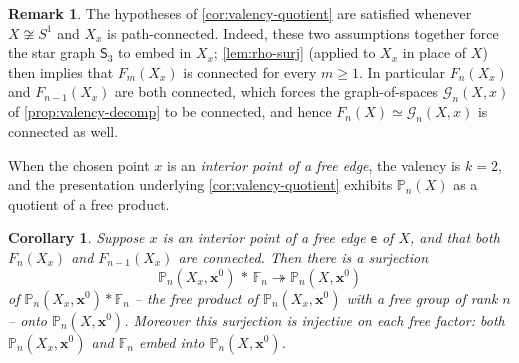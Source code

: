 \documentclass[reqno]{amsart}
\newtheorem{corollary}[theorem]{Corollary}
\theoremstyle{definition}
\newtheorem{remark}[theorem]{Remark}
\newcommand\bfx{\mathbf{x}}
\newcommand\cG{\mathcal{G}}
\newcommand\sfS{\mathsf{S}}
\newcommand\sfe{\mathsf{e}}
\newcommand{\PB}{\mathbb{P}}
\newcommand{\base}{\bfx^0}
\numberwithin{equation}{section}
\begin{document}
\begin{remark}\label{rem:cor28-hypotheses}
The hypotheses of \cref{cor:valency-quotient} are
satisfied whenever \(X\not\cong S^1\) and \(X_x\) is path-connected.
Indeed, these two assumptions together force the star graph
\(\sfS_3\) to embed in \(X_x\); \cref{lem:rho-surj}
(applied to \(X_x\) in place of \(X\)) then implies that \(F_m(X_x)\) is
connected for every \(m\geq 1\). In particular \(F_n(X_x)\) and
\(F_{n-1}(X_x)\) are both connected, which forces the graph-of-spaces
\(\cG_n(X,x)\) of \cref{prop:valency-decomp} to
be connected, and hence \(F_n(X)\simeq\cG_n(X,x)\) is
connected as well.
\end{remark}

When the chosen point \(x\) is an \emph{interior point of a free
edge}, the valency is \(k=2\), and the presentation underlying
\cref{cor:valency-quotient} exhibits \(\PB_n(X)\) as a
quotient of a free product.

\begin{corollary}\label{cor:free-edge-splitting}
Suppose \(x\) is an interior point of a free edge \(\sfe\) of \(X\), and
that both \(F_n(X_x)\) and \(F_{n-1}(X_x)\) are connected. Then there
is a surjection
\[
\PB_n(X_x,\base)\,\ast\,\mathbb{F}_n
\twoheadrightarrow
\PB_n(X,\base)
\]
of \(\PB_n(X_x,\base)\ast\mathbb{F}_n\) -- the free product of
\(\PB_n(X_x,\base)\) with a free group of rank \(n\) -- onto
\(\PB_n(X,\base)\). Moreover this surjection is injective on each free
factor: both \(\PB_n(X_x,\base)\) and \(\mathbb{F}_n\) embed into
\(\PB_n(X,\base)\).
\end{corollary}
\end{document}
